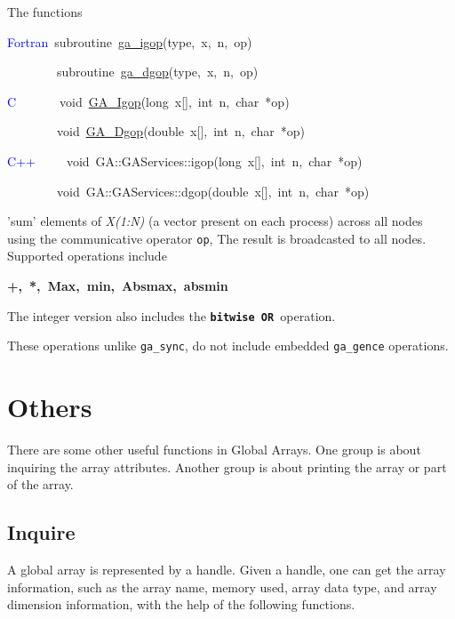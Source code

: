 The functions
\begin{lyxcode}
\textcolor{blue}{Fortran}~subroutine~\href{http://www.emsl.pnl.gov/docs/global/ga_ops.html\#ga_igop}{ga\_{}igop}(type,~x,~n,~op)~

~~~~~~~~subroutine~\href{http://www.emsl.pnl.gov/docs/global/ga_ops.html\#ga_igop}{ga\_{}dgop}(type,~x,~n,~op)~

\textcolor{blue}{C}~~~~~~~void~\href{http://www.emsl.pnl.gov/docs/global/c_nga_ops.html\#ga_igop}{GA\_{}Igop}(long~x{[}{]},~int~n,~char~{*}op)~

~~~~~~~~void~\href{http://www.emsl.pnl.gov/docs/global/c_nga_ops.html\#ga_dgop}{GA\_{}Dgop}(double~x{[}{]},~int~n,~char~{*}op)~

\textcolor{blue}{C++}~~~~~void~GA::GAServices::igop(long~x{[}{]},~int~n,~char~{*}op)~

~~~~~~~~void~GA::GAServices::dgop(double~x{[}{]},~int~n,~char~{*}op)
\end{lyxcode}
'sum' elements of \emph{X(1:N)} (a vector present on each process)
across all nodes using the communicative operator \texttt{op}, The
result is broadcasted to all nodes. Supported operations include
\begin{lyxcode}
\textbf{+,~{*},~Max,~min,~Absmax,~absmin}
\end{lyxcode}
The integer version also includes the \texttt{\textbf{bitwise OR }}operation.

These operations unlike \texttt{ga\_sync}, do not include embedded
\texttt{ga\_gence} operations. 


\section{Others }

There are some other useful functions in Global Arrays. One group
is about inquiring the array attributes. Another group is about printing
the array or part of the array. 


\subsection{Inquire }

A global array is represented by a handle. Given a handle, one can
get the array information, such as the array name, memory used, array
data type, and array dimension information, with the help of the following
functions.


